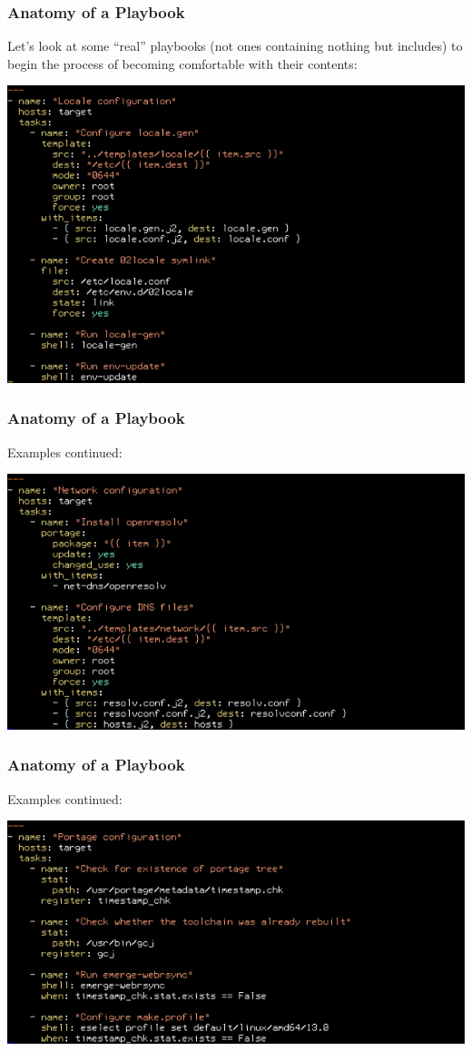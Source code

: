 \documentclass[helvetica,english,utf8,notitle,nologo]{beamer}
\begin{document}
\begin{frame}
  \frametitle{Anatomy of a Playbook}

  Let's look at some ``real'' playbooks (not ones containing nothing
  but includes) to begin the process of becoming comfortable with
  their contents:

  \includegraphics[scale=0.44]{img_17}
\end{frame}

\begin{frame}
  \frametitle{Anatomy of a Playbook}

  Examples continued:

  \includegraphics[scale=0.44]{img_18}
\end{frame}

\begin{frame}
  \frametitle{Anatomy of a Playbook}

  Examples continued:

  \includegraphics[scale=0.44]{img_19}
\end{frame}
\end{document}
